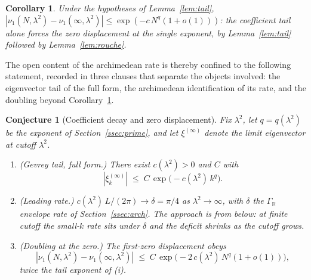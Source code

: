 \documentclass[11pt,a4paper]{article}
\newtheorem{corollary}{Corollary}
\newtheorem{conjecture}{Conjecture}
\begin{document}
\begin{corollary}\label{cor:single}
Under the hypotheses of Lemma~\ref{lem:tail},
$|\nu_1(N,\lambda^2)-\nu_1(\infty,\lambda^2)|\le\exp(-c\,N^{q}(1+o(1)))$: the
coefficient tail alone forces the zero displacement at the single exponent,
by Lemma~\ref{lem:tail} followed by Lemma~\ref{lem:rouche}.
\end{corollary}

The open content of the archimedean rate is thereby confined to the following
statement, recorded in three clauses that separate the objects involved: the
eigenvector tail of the full form, the archimedean identification of its rate,
and the doubling beyond Corollary~\ref{cor:single}.

\begin{conjecture}[Coefficient decay and zero displacement]\label{conj:decay}
Fix $\lambda^2$, let $q=q(\lambda^2)$ be the exponent of
Section~\ref{ssec:prime}, and let $\xi^{(\infty)}$ denote the limit
eigenvector at cutoff $\lambda^2$.
\begin{enumerate}
\item[(i)] \emph{(Gevrey tail, full form.)} There exist $c(\lambda^2)>0$ and
  $C$ with
  \[
    |\xi^{(\infty)}_k|\;\le\;C\,\exp\!\bigl(-c(\lambda^2)\,k^{q}\bigr).
  \]
\item[(ii)] \emph{(Leading rate.)} $c(\lambda^2)\,L/(2\pi)\to\delta=\pi/4$
  as $\lambda^2\to\infty$, with $\delta$ the $\Gamma_\mathbb{R}$ envelope
  rate of Section~\ref{ssec:arch}. The approach is from below: at finite
  cutoff the small-$k$ rate sits under $\delta$ and the deficit shrinks as
  the cutoff grows.
\item[(iii)] \emph{(Doubling at the zero.)} The first-zero displacement obeys
  \[
    |\nu_1(N,\lambda^2)-\nu_1(\infty,\lambda^2)|
    \;\le\;C\,\exp\!\bigl(-2\,c(\lambda^2)\,N^{q}(1+o(1))\bigr),
  \]
  twice the tail exponent of (i).
\end{enumerate}
\end{conjecture}
\end{document}
